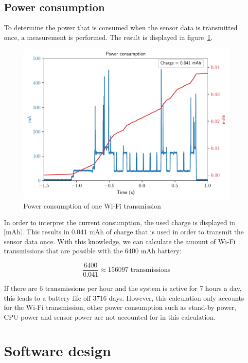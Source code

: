 \documentclass[11pt,a4paper]{article}
\begin{document}
\subsection{Power consumption}
To determine the power that is consumed when the sensor data is transmitted once, a measurement is performed. The result is displayed in figure~\ref{fig:wifi_pwr}.
\begin{figure}[H]
	\centering
	\includegraphics[width=1.0\linewidth]{wifi_pwr.pdf}
	\caption{Power consumption of one Wi-Fi transmission}
	\label{fig:wifi_pwr}
\end{figure}
In order to interpret the current consumption, the used charge is displayed in [mAh]. This results in 0.041 mAh of charge that is used in order to transmit the sensor data once. With this knowledge, we can calculate the amount of Wi-Fi transmissions that are possible with the 6400 mAh battery:

\begin{equation}
	\frac{6400}{0.041} \approx 156097 \text{ transmissions}
\end{equation}

If there are 6 transmissions per hour and the system is active for 7 hours a day, this leads to a battery life off 3716 days.  However, this calculation only accounts for the Wi-Fi transmission, other power consumption such as stand-by power, CPU power and sensor power are not accounted for in this calculation. 

\section{Software design}
\end{document}
